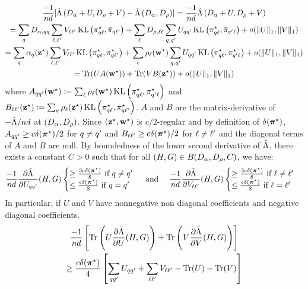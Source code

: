 \begin{multline*}
\frac{-1}{nd} [\Lambtilde\left( D_{\pii} + U, D_{\rhoo} + V \right) - \Lambtilde\left( D_{\pii}, D_{\rhoo}\right)] = \frac{-1}{nd} \Lambtilde\left( D_{\pii} + U, D_{\rhoo} + V \right)\\ 
  = \sum_{\kk} D_{\pii,\kk\kk} \sum_{\el, \lp} V_{\el \lp} \KL\left(\alskl, \baral_{\kk\lp} \right) + \sum_{\el} D_{\rhoo,\el\el} \sum_{\kk, \kp} U_{\kk\kp} \KL\left(\alskl, \baral_{\kp\el} \right) + \smallO(\|U\|_1, \|V\|_1) \\
  = \sum_{\kk} \pik(\bzs) \sum_{\el, \lp} V_{\el\lp} \KL\left(\alskl, \als_{\kk\lp}\right) + \sum_{\el} \rhol(\bws) \sum_{\kk, \kp} U_{\kk \kp} \KL\left(\alskl, \als_{\kp\el} \right) + \smallO(\|U\|_1, \|V\|_1) \\
  = \Trace(U A(\bws)) + \Trace(V B(\bzs)) + \smallO(\|U\|_1, \|V\|_1) \\
\end{multline*}
where $A_{qq'}(\mathbf{w}^\star) \coloneqq  \sum_{\ell} \rho_\ell(\mathbf{w}^\star) \operatorname{KL}\left(\pi^\star_{q\ell}, \pi^\star_{q'\ell} \right)$ and $B_{\ell\ell'}(\mathbf{z}^\star) \coloneqq \sum_{q} \rho_\ell(\mathbf{z}^\star) \operatorname{KL}\left(\pi^\star_{q\ell}, \pi^\star_{q\ell'} \right)$. $A$ and $B$ are the matrix-derivative of $-\tilde{\Lambda}/nd$ at $(D_{\alpha}, D_{\rho})$. Since $(\mathbf{z}^\star, \mathbf{w}^\star)$ is $c/2$-regular and by definition of $\delta(\boldsymbol{\pi}^\star)$, $A_{qq'} \geq c\delta(\boldsymbol{\pi}^\star)/2$ for $q \neq q'$ and $B_{\ell\ell'} \geq c\delta(\boldsymbol{\pi}^\star)/2$ for $\ell \neq \ell'$ and the diagonal terms of $A$ and $B$ are null. By boundedness of the lower second derivative of $\tilde{\Lambda}$, there exists a constant $C > 0$ such that for all $(H, G) \in B(D_{\alpha}, D_{\rho}, C)$, we have:
\begin{equation*}
\frac{-1}{nd} \frac{\partial \Lambtilde}{\partial U_{\kk\kp}}(H, G) \begin{cases} \geq \frac{3c\delta(\bals)}{8} \text { if } \kk \neq \kp \\ \leq \frac{c\delta(\bals)}{8} \text { if } \kk = \kp \end{cases} \text{ and } \quad 
\frac{-1}{nd} \frac{\partial \Lambtilde}{\partial V_{\el\lp}}(H, G) \begin{cases} \geq \frac{3c\delta(\bals)}{8} \text { if } \el \neq \lp \\ \leq \frac{c\delta(\bals)}{8} \text { if } \el = \lp \end{cases}
\end{equation*}
In particular, if $U$ and $V$ have nonnegative non diagonal coefficients and negative diagonal coefficients. 
\begin{multline*}
\frac{-1}{nd}\left[ \Trace\left(U \frac{\partial \Lambtilde}{\partial U}(H, G) \right) + \Trace\left(V \frac{\partial \Lambtilde}{\partial V}(H, G) \right) \right]\\\geq \frac{c\delta(\bals)}{4} \left[ \sum_{\kk\kp} U_{\kk\kp} + \sum_{\el\lp} V_{\el\lp} - \Trace(U) - \Trace(V)\right]
\end{multline*}
